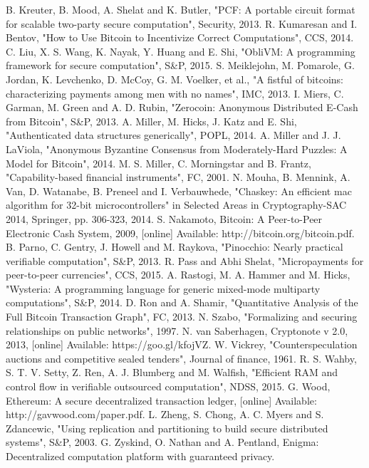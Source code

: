 \documentclass{xduugtrans}
\begin{document}
\begin{thebibliography}{99}
     B. Kreuter, B. Mood, A. Shelat and K. Butler, "PCF: A portable circuit format for scalable two-party secure computation", Security, 2013.
     R. Kumaresan and I. Bentov, "How to Use Bitcoin to Incentivize Correct Computations", CCS, 2014.
     C. Liu, X. S. Wang, K. Nayak, Y. Huang and E. Shi, "ObliVM: A programming framework for secure computation", S\&P, 2015.
     S. Meiklejohn, M. Pomarole, G. Jordan, K. Levchenko, D. McCoy, G. M. Voelker, et al., "A fistful of bitcoins: characterizing payments among men with no names", IMC, 2013.
     I. Miers, C. Garman, M. Green and A. D. Rubin, "Zerocoin: Anonymous Distributed E-Cash from Bitcoin", S\&P, 2013.
     A. Miller, M. Hicks, J. Katz and E. Shi, "Authenticated data structures generically", POPL, 2014.
     A. Miller and J. J. LaViola, "Anonymous Byzantine Consensus from Moderately-Hard Puzzles: A Model for Bitcoin", 2014.
     M. S. Miller, C. Morningstar and B. Frantz, "Capability-based financial instruments", FC, 2001.
     N. Mouha, B. Mennink, A. Van, D. Watanabe, B. Preneel and I. Verbauwhede, "Chaskey: An efficient mac algorithm for 32-bit microcontrollers" in Selected Areas in Cryptography-SAC 2014, Springer, pp. 306-323, 2014.
     S. Nakamoto, Bitcoin: A Peer-to-Peer Electronic Cash System, 2009, [online] Available: http://bitcoin.org/bitcoin.pdf.
     B. Parno, C. Gentry, J. Howell and M. Raykova, "Pinocchio: Nearly practical verifiable computation", S\&P, 2013.
     R. Pass and Abhi Shelat, "Micropayments for peer-to-peer currencies", CCS, 2015.
     A. Rastogi, M. A. Hammer and M. Hicks, "Wysteria: A programming language for generic mixed-mode multiparty computations", S\&P, 2014.
     D. Ron and A. Shamir, "Quantitative Analysis of the Full Bitcoin Transaction Graph", FC, 2013.
     N. Szabo, "Formalizing and securing relationships on public networks", 1997.
     N. van Saberhagen, Cryptonote v 2.0, 2013, [online] Available: https://goo.gl/kfojVZ.
     W. Vickrey, "Counterspeculation auctions and competitive sealed tenders", Journal of finance, 1961.
     R. S. Wahby, S. T. V. Setty, Z. Ren, A. J. Blumberg and M. Walfish, "Efficient RAM and control flow in verifiable outsourced computation", NDSS, 2015.
     G. Wood, Ethereum: A secure decentralized transaction ledger, [online] Available: http://gavwood.com/paper.pdf.
     L. Zheng, S. Chong, A. C. Myers and S. Zdancewic, "Using replication and partitioning to build secure distributed systems", S\&P, 2003.
     G. Zyskind, O. Nathan and A. Pentland, Enigma: Decentralized computation platform with guaranteed privacy.
\end{thebibliography}
\backmatter
\end{document}
